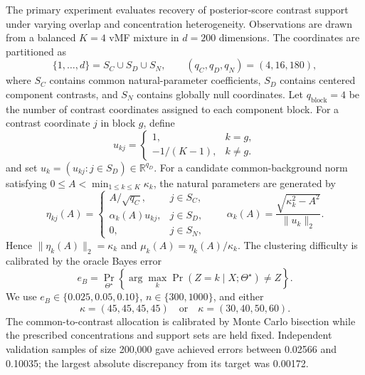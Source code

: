 \documentclass[preprint,12pt,authoryear]{elsarticle}
\begin{document}
The primary experiment evaluates recovery of posterior-score contrast support
under varying overlap and concentration heterogeneity. Observations are drawn
from a balanced $K=4$ vMF mixture in $d=200$ dimensions. The coordinates are
partitioned as
\[
\{1,\ldots,d\}=S_C\cup S_D\cup S_N,
\qquad
(q_C,q_D,q_N)=(4,16,180),
\]
where $S_C$ contains common natural-parameter coefficients, $S_D$ contains
centered component contrasts, and $S_N$ contains globally null coordinates.
Let $q_{\mathrm{block}}=4$ be the number of contrast coordinates assigned to
each component block. For a contrast coordinate $j$ in block $g$, define
\[
u_{kj}=
\begin{cases}
1, & k=g,\\
-1/(K-1), & k\ne g.
\end{cases}
\]
and set $u_k=(u_{kj}:j\in S_D)\in\mathbb R^{q_D}$. For a candidate
common-background norm satisfying
$0\leq A<\min_{1\leq k\leq K}\kappa_k$, the natural parameters are generated by
\[
\eta_{kj}(A)=
\begin{cases}
A/\sqrt{q_C}, & j\in S_C,\\
\alpha_k(A)u_{kj}, & j\in S_D,\\
0, & j\in S_N,
\end{cases}
\qquad
\alpha_k(A)=\frac{\sqrt{\kappa_k^2-A^2}}{\lVert u_k\rVert_2}.
\]
Hence $\lVert\eta_k(A)\rVert_2=\kappa_k$ and
$\mu_k(A)=\eta_k(A)/\kappa_k$. The clustering difficulty is
calibrated by the oracle Bayes error
\[
e_B=\Pr_{\Theta^\star}
\left\{
\arg\max_k\Pr(Z=k\mid X;\Theta^\star)\ne Z
\right\}.
\]
We use $e_B\in\{0.025,0.05,0.10\}$, $n\in\{300,1000\}$, and either
\[
\kappa=(45,45,45,45)
\quad\text{or}\quad
\kappa=(30,40,50,60).
\]
The common-to-contrast allocation is calibrated by Monte Carlo bisection while
the prescribed concentrations and support sets are held fixed. Independent
validation samples of size 200,000 gave achieved errors between 0.02566 and
0.10035; the largest absolute discrepancy from its target was 0.00172.
\end{document}
